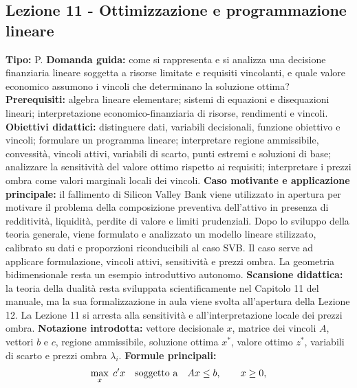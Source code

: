 \documentclass[12pt,a4paper]{article}%
\newcommand{\1}{\mathbf{1}}
\begin{document}
\subsection{Lezione 11 - Ottimizzazione e programmazione lineare}

\textbf{Tipo:} P.\newline
\textbf{Domanda guida:} come si rappresenta e si analizza una decisione
finanziaria lineare soggetta a risorse limitate e requisiti vincolanti, e
quale valore economico assumono i vincoli che determinano la soluzione
ottima?\newline
\textbf{Prerequisiti:} algebra lineare elementare; sistemi di equazioni e
disequazioni lineari; interpretazione economico-finanziaria di risorse,
rendimenti e vincoli.\newline
\textbf{Obiettivi didattici:} distinguere dati, variabili decisionali,
funzione obiettivo e vincoli; formulare un programma lineare; interpretare
regione ammissibile, convessit\`{a}, vincoli attivi, variabili di scarto,
punti estremi e soluzioni di base; analizzare la sensitivit\`{a} del valore
ottimo rispetto ai requisiti; interpretare i prezzi ombra come valori
marginali locali dei vincoli.\newline
\textbf{Caso motivante e applicazione principale:} il fallimento di Silicon
Valley Bank viene utilizzato in apertura per motivare il problema della
composizione preventiva dell'attivo in presenza di redditivit\`{a},
liquidit\`{a}, perdite di valore e limiti prudenziali. Dopo lo sviluppo
della teoria generale, viene formulato e analizzato un modello lineare
stilizzato, calibrato su dati e proporzioni riconducibili al caso SVB. Il
caso serve ad applicare formulazione, vincoli attivi, sensitivit\`{a} e
prezzi ombra. La geometria bidimensionale resta un esempio introduttivo
autonomo.\newline
\textbf{Scansione didattica:} la teoria della dualit\`{a} resta sviluppata
scientificamente nel Capitolo 11 del manuale, ma la sua formalizzazione in
aula viene svolta all'apertura della Lezione 12. La Lezione 11 si arresta
alla sensitivit\`{a} e all'interpretazione locale dei prezzi ombra.\newline
\textbf{Notazione introdotta:} vettore decisionale $x$, matrice dei vincoli
$A$, vettori $b$ e $c$, regione ammissibile, soluzione ottima $x^{*}$,
valore ottimo $z^{*}$, variabili di scarto e prezzi ombra $\lambda_i$.\newline
\textbf{Formule principali:}
\[
\max_{x}\;c'x
\quad\hbox{soggetto a}\quad
Ax\leq b,\qquad x\geq0,
\]
\end{document}
